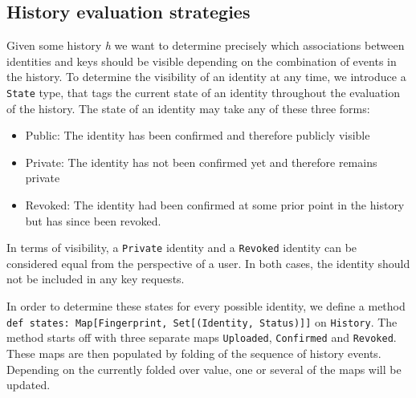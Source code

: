 \subsection{History evaluation strategies}
Given some history \emph{h} we want to determine precisely which associations between identities and keys should be visible depending on the combination of events in the history.
To determine the visibility of an identity at any time, we introduce a \texttt{State} type, that tags the current state of an identity throughout the evaluation of the history.
The state of an identity may take any of these three forms: 
\begin{itemize}
    \item Public: The identity has been confirmed and therefore publicly visible
    \item Private: The identity has not been confirmed yet and therefore remains private
    \item Revoked: The identity had been confirmed at some prior point in the history but has since been revoked.
\end{itemize}
In terms of visibility, a \texttt{Private} identity and a \texttt{Revoked} identity can be considered equal from the perspective of a user. In both cases, the identity should not be included in any key requests.

In order to determine these states for every possible identity, we define a method \texttt{def states: Map[Fingerprint, Set[(Identity, Status)]]} on \texttt{History}.
The method starts off with three separate maps \texttt{Uploaded}, \texttt{Confirmed} and \texttt{Revoked}. These maps are then populated by folding of the sequence of history events.
Depending on the currently folded over value, one or several of the maps will be updated. 


\newpage

